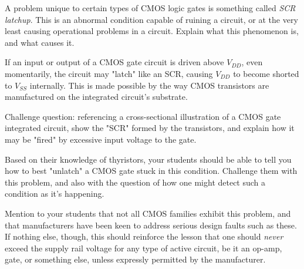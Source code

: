 

A problem unique to certain types of CMOS logic gates is something called {\it SCR latchup}.  This is an abnormal condition capable of ruining a circuit, or at the very least causing operational problems in a circuit.  Explain what this phenomenon is, and what causes it.







If an input or output of a CMOS gate circuit is driven above $V_{DD}$, even momentarily, the circuit may "latch" like an SCR, causing $V_{DD}$ to become shorted to $V_{SS}$ internally.  This is made possible by the way CMOS transistors are manufactured on the integrated circuit's substrate.

\vskip 10pt

Challenge question: referencing a cross-sectional illustration of a CMOS gate integrated circuit, show the "SCR" formed by the transistors, and explain how it may be "fired" by excessive input voltage to the gate.







Based on their knowledge of thyristors, your students should be able to tell you how to best "unlatch" a CMOS gate stuck in this condition.  Challenge them with this problem, and also with the question of how one might detect such a condition as it's happening.

Mention to your students that not all CMOS families exhibit this problem, and that manufacturers have been keen to address serious design faults such as these.  If nothing else, though, this should reinforce the lesson that one should {\it never} exceed the supply rail voltage for any type of active circuit, be it an op-amp, gate, or something else, unless expressly permitted by the manufacturer.




